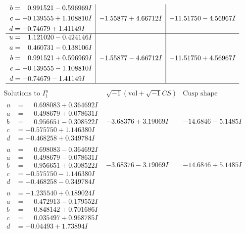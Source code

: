 \documentclass[1p]{elsarticle_modified}
\theoremstyle{definition}
\newcommand{\I}{\sqrt{-1}}
\begin{document}
$$\begin{array}{c|c|c}
\begin{aligned}
b &= \phantom{-}0.991521 - 0.596969 I \\
c &= -0.139555 + 1.108810 I \\
d &= -0.74679 + 1.41149 I\end{aligned}
 & -1.55877 + 4.66712 I & -11.51750 - 4.56967 I \\ \hline\begin{aligned}
u &= \phantom{-}1.121020 - 0.424146 I \\
a &= \phantom{-}0.460731 - 0.138106 I \\
b &= \phantom{-}0.991521 + 0.596969 I \\
c &= -0.139555 - 1.108810 I \\
d &= -0.74679 - 1.41149 I\end{aligned}
 & -1.55877 - 4.66712 I & -11.51750 + 4.56967 I\\
 \hline 
 \end{array}$$\newpage$$\begin{array}{c|c|c}  
\text{Solutions to }I^u_{1}& \I (\text{vol} + \sqrt{-1}CS) & \text{Cusp shape}\\
 \hline 
\begin{aligned}
u &= \phantom{-}0.698083 + 0.364692 I \\
a &= \phantom{-}0.498679 + 0.078631 I \\
b &= \phantom{-}0.956651 - 0.308522 I \\
c &= -0.575750 + 1.146380 I \\
d &= -0.468258 + 0.349784 I\end{aligned}
 & -3.68376 + 3.19069 I & -14.6846 - 5.1485 I \\ \hline\begin{aligned}
u &= \phantom{-}0.698083 - 0.364692 I \\
a &= \phantom{-}0.498679 - 0.078631 I \\
b &= \phantom{-}0.956651 + 0.308522 I \\
c &= -0.575750 - 1.146380 I \\
d &= -0.468258 - 0.349784 I\end{aligned}
 & -3.68376 - 3.19069 I & -14.6846 + 5.1485 I \\ \hline\begin{aligned}
u &= -1.235540 + 0.189024 I \\
a &= \phantom{-}0.472913 - 0.179552 I \\
b &= \phantom{-}0.848142 + 0.701686 I \\
c &= \phantom{-}0.035497 + 0.968785 I \\
d &= -0.04493 + 1.73894 I\end{aligned}

\end{array}$$
\end{document}
